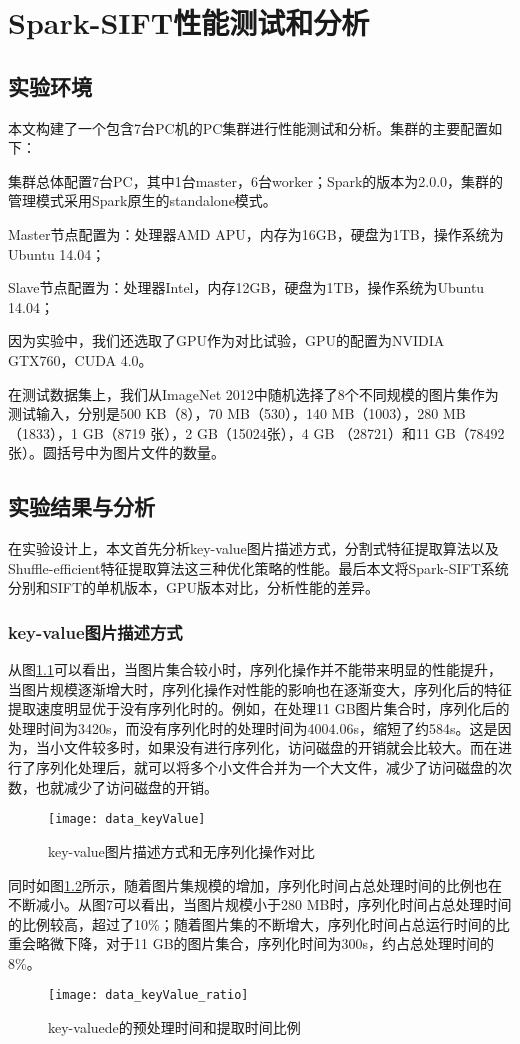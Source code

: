 ﻿\chapter{Spark-SIFT性能测试和分析}
\section{实验环境}
本文构建了一个包含7台PC机的PC集群进行性能测试和分析。集群的主要配置如下：
\begin{compactenum}
\item 集群总体配置7台PC，其中1台master，6台worker；Spark的版本为2.0.0，集群的管理模式采用Spark原生的standalone模式。
\item Master节点配置为：处理器AMD APU，内存为16GB，硬盘为1TB，操作系统为Ubuntu 14.04；
\item Slave节点配置为：处理器Intel，内存12GB，硬盘为1TB，操作系统为Ubuntu 14.04；
\end{compactenum}

因为实验中，我们还选取了GPU作为对比试验，GPU的配置为NVIDIA GTX760，CUDA 4.0。

在测试数据集上，我们从ImageNet 2012中随机选择了8个不同规模的图片集作为测试输入，分别是500 KB（8），70 MB（530），140 MB（1003），280 MB（1833），1 GB（8719 张），2 GB（15024张），4 GB （28721）和11 GB（78492张）。圆括号中为图片文件的数量。
\section{实验结果与分析}
在实验设计上，本文首先分析key-value图片描述方式，分割式特征提取算法以及Shuffle-efficient特征提取算法这三种优化策略的性能。最后本文将Spark-SIFT系统分别和SIFT的单机版本，GPU版本对比，分析性能的差异。
\subsection{key-value图片描述方式}
从图\ref{fig:data_keyValue}可以看出，当图片集合较小时，序列化操作并不能带来明显的性能提升，当图片规模逐渐增大时，序列化操作对性能的影响也在逐渐变大，序列化后的特征提取速度明显优于没有序列化时的。例如，在处理11 GB图片集合时，序列化后的处理时间为3420s，而没有序列化时的处理时间为4004.06s，缩短了约584s。这是因为，当小文件较多时，如果没有进行序列化，访问磁盘的开销就会比较大。而在进行了序列化处理后，就可以将多个小文件合并为一个大文件，减少了访问磁盘的次数，也就减少了访问磁盘的开销。
\begin{figure}[htp]
\centering
\texttt{[image: data\_keyValue]}
\caption{key-value图片描述方式和无序列化操作对比}
\label{fig:data_keyValue}
\end{figure}
同时如图\ref{fig:data_keyValue_ratio}所示，随着图片集规模的增加，序列化时间占总处理时间的比例也在不断减小。从图7可以看出，当图片规模小于280 MB时，序列化时间占总处理时间的比例较高，超过了10\%；随着图片集的不断增大，序列化时间占总运行时间的比重会略微下降，对于11 GB的图片集合，序列化时间为300s，约占总处理时间的8\%。
\begin{figure}[htp]
\centering
\texttt{[image: data\_keyValue\_ratio]}
\caption{key-valuede的预处理时间和提取时间比例}
\label{fig:data_keyValue_ratio}
\end{figure}

